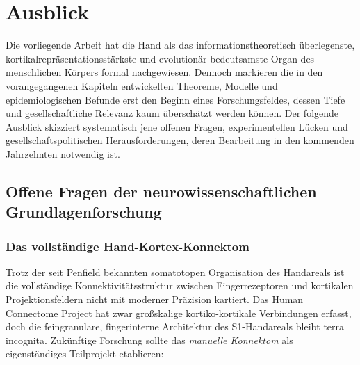 ﻿\documentclass[12pt,a4paper]{report}
\theoremstyle{plain}
\theoremstyle{definition}
\theoremstyle{remark}
\begin{document}
\chapter{Ausblick}
\label{chap:ausblick}

Die vorliegende Arbeit hat die Hand als das informationstheoretisch
überlegenste, kortikalrepräsentationsstärkste und evolutionär bedeutsamste
Organ des menschlichen Körpers formal nachgewiesen. Dennoch markieren
die in den vorangegangenen Kapiteln entwickelten Theoreme, Modelle und
epidemiologischen Befunde erst den Beginn eines Forschungsfeldes, dessen
Tiefe und gesellschaftliche Relevanz kaum überschätzt werden können.
Der folgende Ausblick skizziert systematisch jene offenen Fragen,
experimentellen Lücken und gesellschaftspolitischen Herausforderungen,
deren Bearbeitung in den kommenden Jahrzehnten notwendig ist.

\section{Offene Fragen der neurowissenschaftlichen Grundlagenforschung}

\subsection{Das vollständige Hand-Kortex-Konnektom}

Trotz der seit Penfield bekannten somatotopen Organisation des Handareals
ist die vollständige Konnektivitätsstruktur zwischen Fingerrezeptoren
und kortikalen Projektionsfeldern nicht mit moderner Präzision kartiert.
Das Human Connectome Project hat zwar großskalige kortiko-kortikale
Verbindungen erfasst, doch die feingranulare, fingerinterne Architektur
des S1-Handareals bleibt terra incognita. Zukünftige Forschung sollte
das \emph{manuelle Konnektom} als eigenständiges Teilprojekt etablieren:
\end{document}
